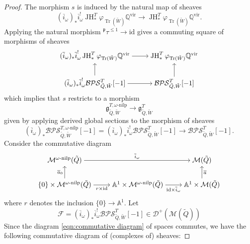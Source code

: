 \documentclass{amsart}
\DeclareMathOperator{\Tr}{\mathrm{Tr}}
\def\vir{\mathrm{vir}}
\DeclareMathOperator{\JH}{\mathrm{JH}}
\def\oi{\overline{i}}
\def\CM{{\mathcal{M}}}
\def\tQ{\tilde{Q}}
\def\tbpsw{\mathfrak{g}^{T,\omega\text{-nilp}}_{\tilde{Q},\tilde{W}}}
\def\tbps{\mathfrak{g}^T_{\tilde{Q},\tilde{W}}}
\begin{document}
\begin{proof}
The morphism $s$ is induced by the natural map of sheaves \[ (\oi_{\omega})_{*}\oi_{\omega}^! \JH^T_{*} \varphi_{\Tr(\tilde{W})} \mathbb{Q}^{\vir} \rightarrow \JH^T_{*} \varphi_{\Tr(\tilde{W})} \mathbb{Q}^{\vir}.\] Applying the natural morphism $^{\mathfrak{p}}\tau^{\leq 1} \rightarrow \mathrm{id}$ gives a commuting square of morphisms of sheaves
\[\begin{tikzcd}[cramped]
	{(\oi_{\omega})_{*} \oi_{\omega}^! \JH^T_{*} \varphi_{\Tr(\tilde{W})} \mathbb{Q}^{\vir}} & {\JH^T_{*} \varphi_{\Tr(\tilde{W})} \mathbb{Q}^{\vir}} \\
	{(\oi_{\omega})_{*} \oi_{\omega}^{!}\mathcal{BPS}^T_{\tilde{Q},\tilde{W}}[-1]} & {\mathcal{BPS}^T_{\tilde{Q},\tilde{W}}}[-1]
	\arrow[from=1-1, to=1-2]
	\arrow[from=2-1, to=1-1]
	\arrow[from=2-1, to=2-2]
	\arrow[from=2-2, to=1-2]
\end{tikzcd}\]
which implies that $s$ restricts to a morphism 
\[ 
\tbpsw \rightarrow  \tbps 
\]
given by applying derived global sections to the morphism of sheaves \begin{equation} \label{eqn:morphismofbps}
 (\oi_{\omega})_* \mathcal{BPS}^{T,\omega\text{-nilp}}_{\tilde{Q},\tilde{W}}[-1] = (\oi_{\omega})_*\oi_{\omega}^! \mathcal{BPS}^T_{\tilde{Q},\tilde{W}}[-1] \rightarrow \mathcal{BPS}^T_{\tilde{Q},\tilde{W}}[-1].   
\end{equation}
Consider the commutative diagram
\begin{equation}
\label{eqn:commutative diagram}
\begin{tikzcd}[cramped] 
{\mathcal{M}^{\omega \text{-nilp}}(\tilde{Q})} && {\mathcal{M}(\tilde{Q})} \\
{\{0\} \times \mathcal{M}^{\omega\text{-nilp}}(\tilde{Q})} & {\mathbb{A}^1 \times \mathcal{M}^{\omega\text{-nilp}}(\tilde{Q})} & {\mathbb{A}^1 \times \mathcal{M}(\tilde{Q})}
	\arrow["{\oi_{\omega}}", from=1-1, to=1-3]
	\arrow["\overline{a}_0", from=2-1, to=1-1]
	\arrow["{ r \times \mathrm{id}}"', from=2-1, to=2-2]
	\arrow["{\mathrm{id} \times \oi_{\omega}}"', from=2-2, to=2-3]
	\arrow["\overline{a}"', from=2-3, to=1-3]
\end{tikzcd} 
\end{equation}
where $r$ denotes the inclusion $\{0\} \rightarrow \mathbb{A}^1$. Let 
$$
\mathcal{F} = (\oi_{\omega})_*\oi_{\omega}^! \mathcal{BPS}^T_{\tilde{Q},\tilde{W}}[-1] \in \mathcal{D}^+(\CM(\tQ))
$$
Since the diagram \eqref{eqn:commutative diagram} of spaces commutes, we have the following commutative diagram of (complexes of) sheaves:

\end{proof}
\end{document}
